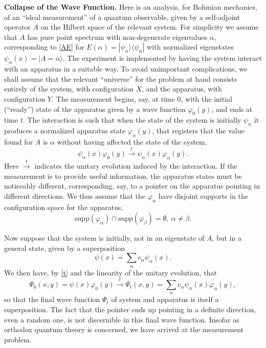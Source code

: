\documentclass[12pt]{report}
\newcommand{\be}{\begin{equation}}
\newcommand{\ee}{\end{equation}}
\begin{document}
\bigskip

\noindent\textbf{Collapse of the Wave Function.}
Here is an analysis, for Bohmian mechanics, of an ``ideal measurement'' 
of a quantum observable, given by a self-adjoint
operator $A$ on the Hilbert space of the relevant system. For simplicity we assume that $A$ has pure point spectrum with non-degenerate eigenvalues $\alpha$, corresponding to \eqref{AE} for $E(\alpha) = |\psi_\alpha\rangle \langle \psi_\alpha|$ with normalized eigenstates
$\psi_{\alpha}(x)=|A=\alpha\rangle$. The experiment is 
implemented by having the system interact with an apparatus in a
suitable way. To avoid unimportant complications, we shall assume that the relevant ``universe'' for the problem at hand consists entirely of the system, with configuration $X$, and the apparatus, with configuration $Y$.
The measurement begins, say, at time 0, with the initial (``ready'') state of
the apparatus given by a wave function $\varphi_0(y)$, and ends at time
$t$.  The interaction is such that when the state of the system is
initially $\psi_{\alpha}$ it produces a normalized apparatus state
$\varphi_{\alpha}(y)$, that
registers that the value found for $A$ is $\alpha$ without having affected
the state of the system,
\be\label{t}
 \psi_{\alpha}(x)\varphi_0(y)\stackrel{t}{\rightarrow}\psi_{\alpha}(x)\varphi_{\alpha}(y).
\ee
Here $\stackrel{t}{\rightarrow}$ indicates the unitary evolution induced by
the interaction. If the measurement is to provide useful information, the
apparatus states must be noticeably different, corresponding, say,
to a pointer on the apparatus pointing in different directions. We thus
assume that the $\varphi_{\alpha}$ have disjoint supports in the configuration
space for the apparatus,
\be
\text{supp}(\varphi_{\alpha})\cap\text{supp} (\varphi_{\beta})=\emptyset,\  \alpha\neq\beta.
\ee

Now suppose that the system is initially, not in an eigenstate of $A$, but in
a general state, given by a superposition
\be\label{11}
\psi(x)=\sum_{\alpha}c_{\alpha}\psi_{\alpha}(x).
\ee
We then have, by \eqref{t} and the linearity of the unitary evolution, that
\be
\Psi_0(x,y)=\psi(x)\varphi_0(y)\stackrel{t}{\rightarrow}\Psi_t(x,y)=\sum_{\alpha}c_{\alpha}\psi_{\alpha}(x)\varphi_{\alpha}(y),
\ee
so that the final wave function $\Psi_t$ of system and apparatus is itself
a superposition. The fact that the pointer ends up pointing in a definite
direction, even a random one, is not discernible in this final wave
function. Insofar as orthodox quantum theory is concerned, we have arrived at
the measurement problem.
\end{document}
